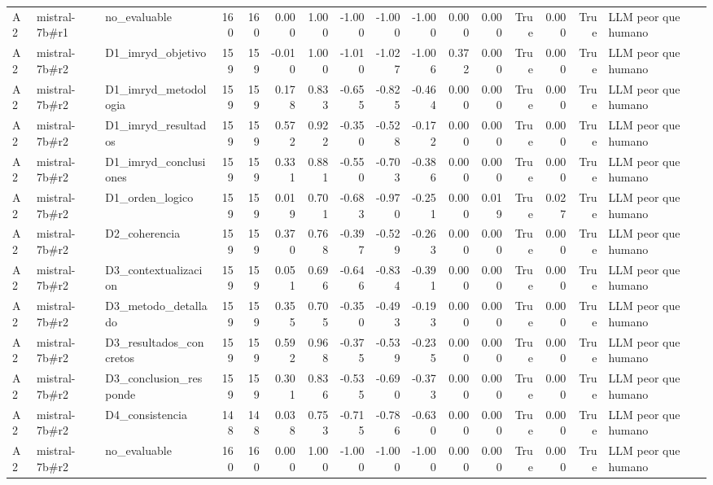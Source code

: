 \begin{table}
{\begin{tabular}{lllrrrrrrrrrrrrl}
A2 & mistral-7b\#r1 & no\_evaluable & 160 & 160 & 0.000 & 1.000 & -1.000 & -1.000 & -1.000 & 0.000 & 0.000 & True & 0.000 & True & LLM peor que humano \\
A2 & mistral-7b\#r2 & D1\_imryd\_objetivo & 159 & 159 & -0.010 & 1.000 & -1.010 & -1.027 & -1.006 & 0.372 & 0.000 & True & 0.000 & True & LLM peor que humano \\
A2 & mistral-7b\#r2 & D1\_imryd\_metodologia & 159 & 159 & 0.178 & 0.833 & -0.655 & -0.825 & -0.464 & 0.000 & 0.000 & True & 0.000 & True & LLM peor que humano \\
A2 & mistral-7b\#r2 & D1\_imryd\_resultados & 159 & 159 & 0.572 & 0.922 & -0.350 & -0.528 & -0.172 & 0.000 & 0.000 & True & 0.000 & True & LLM peor que humano \\
A2 & mistral-7b\#r2 & D1\_imryd\_conclusiones & 159 & 159 & 0.331 & 0.881 & -0.550 & -0.703 & -0.386 & 0.000 & 0.000 & True & 0.000 & True & LLM peor que humano \\
A2 & mistral-7b\#r2 & D1\_orden\_logico & 159 & 159 & 0.019 & 0.701 & -0.683 & -0.970 & -0.251 & 0.000 & 0.019 & True & 0.027 & True & LLM peor que humano \\
A2 & mistral-7b\#r2 & D2\_coherencia & 159 & 159 & 0.370 & 0.768 & -0.397 & -0.529 & -0.263 & 0.000 & 0.000 & True & 0.000 & True & LLM peor que humano \\
A2 & mistral-7b\#r2 & D3\_contextualizacion & 159 & 159 & 0.051 & 0.696 & -0.646 & -0.834 & -0.391 & 0.000 & 0.000 & True & 0.000 & True & LLM peor que humano \\
A2 & mistral-7b\#r2 & D3\_metodo\_detallado & 159 & 159 & 0.355 & 0.705 & -0.350 & -0.493 & -0.193 & 0.000 & 0.000 & True & 0.000 & True & LLM peor que humano \\
A2 & mistral-7b\#r2 & D3\_resultados\_concretos & 159 & 159 & 0.592 & 0.968 & -0.375 & -0.539 & -0.235 & 0.000 & 0.000 & True & 0.000 & True & LLM peor que humano \\
A2 & mistral-7b\#r2 & D3\_conclusion\_responde & 159 & 159 & 0.301 & 0.836 & -0.535 & -0.690 & -0.373 & 0.000 & 0.000 & True & 0.000 & True & LLM peor que humano \\
A2 & mistral-7b\#r2 & D4\_consistencia & 148 & 148 & 0.038 & 0.753 & -0.715 & -0.786 & -0.630 & 0.000 & 0.000 & True & 0.000 & True & LLM peor que humano \\
A2 & mistral-7b\#r2 & no\_evaluable & 160 & 160 & 0.000 & 1.000 & -1.000 & -1.000 & -1.000 & 0.000 & 0.000 & True & 0.000 & True & LLM peor que humano \\

\end{tabular}}
\end{table}
